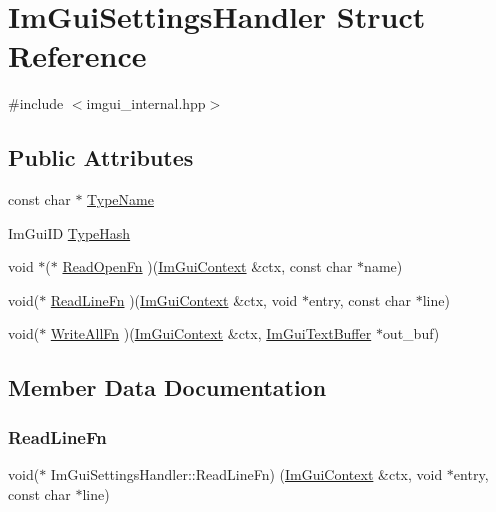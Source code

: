 \hypertarget{struct_im_gui_settings_handler}{}\section{Im\+Gui\+Settings\+Handler Struct Reference}
\label{struct_im_gui_settings_handler}


{\ttfamily \#include $<$imgui\+\_\+internal.\+hpp$>$}

\subsection*{Public Attributes}
\begin{DoxyCompactItemize}
\item 
const char $\ast$ \hyperlink{struct_im_gui_settings_handler_a2b2821603e32a669c855dd97757c83c8}{Type\+Name}
\item 
Im\+Gui\+ID \hyperlink{struct_im_gui_settings_handler_ac2dd47bdb91ae6f50afb5ac14222b552}{Type\+Hash}
\item 
void $\ast$($\ast$ \hyperlink{struct_im_gui_settings_handler_a695060dab855d36def9e46ec78432429}{Read\+Open\+Fn} )(\hyperlink{struct_im_gui_context}{Im\+Gui\+Context} \&ctx, const char $\ast$name)
\item 
void($\ast$ \hyperlink{struct_im_gui_settings_handler_aa384db3c69dc9f291e8e50903408e381}{Read\+Line\+Fn} )(\hyperlink{struct_im_gui_context}{Im\+Gui\+Context} \&ctx, void $\ast$entry, const char $\ast$line)
\item 
void($\ast$ \hyperlink{struct_im_gui_settings_handler_a2c8cb2bd0c8275e910239672a0278cfd}{Write\+All\+Fn} )(\hyperlink{struct_im_gui_context}{Im\+Gui\+Context} \&ctx, \hyperlink{struct_im_gui_text_buffer}{Im\+Gui\+Text\+Buffer} $\ast$out\+\_\+buf)
\end{DoxyCompactItemize}


\subsection{Member Data Documentation}
\hypertarget{struct_im_gui_settings_handler_aa384db3c69dc9f291e8e50903408e381}{}\label{struct_im_gui_settings_handler_aa384db3c69dc9f291e8e50903408e381} 
\subsubsection{\texorpdfstring{Read\+Line\+Fn}{ReadLineFn}}
{\footnotesize\ttfamily void($\ast$ Im\+Gui\+Settings\+Handler\+::\+Read\+Line\+Fn) (\hyperlink{struct_im_gui_context}{Im\+Gui\+Context} \&ctx, void $\ast$entry, const char $\ast$line)}

